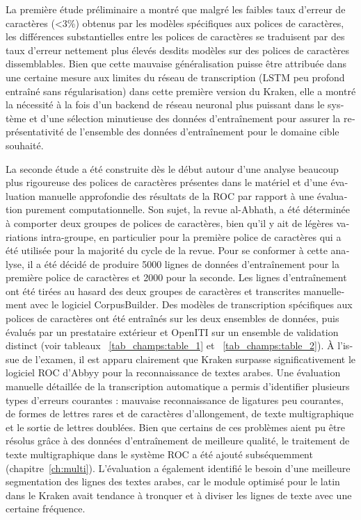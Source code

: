 \begin{french}
La première étude préliminaire a montré que malgré les faibles taux d'erreur de
caractères (<3\%) obtenus par les modèles spécifiques aux polices de
caractères, les différences substantielles entre les polices de caractères se
traduisent par des taux d'erreur nettement plus élevés desdits modèles sur des
polices de caractères dissemblables. Bien que cette mauvaise généralisation
puisse être attribuée dans une certaine mesure aux limites du réseau de
transcription (LSTM peu profond entraîné sans régularisation) dans cette
première version du Kraken, elle a montré la nécessité à la fois d'un backend
de réseau neuronal plus puissant dans le système et d'une sélection minutieuse
des données d'entraînement pour assurer la représentativité de l'ensemble des
données d'entraînement pour le domaine cible souhaité.

La seconde étude a été construite dès le début autour d'une analyse beaucoup
plus rigoureuse des polices de caractères présentes dans le matériel et d'une
évaluation manuelle approfondie des résultats de la ROC par rapport à une
évaluation purement computationnelle. Son sujet, la revue al-Abhath, a été
déterminée à comporter deux groupes de polices de caractères, bien qu'il y ait
de légères variations intra-groupe, en particulier pour la première police de
caractères qui a été utilisée pour la majorité du cycle de la revue. Pour se
conformer à cette analyse, il a été décidé de produire 5000 lignes de données
d'entraînement pour la première police de caractères et 2000 pour la seconde.
Les lignes d'entraînement ont été tirées au hasard des deux groupes de
caractères et transcrites manuellement avec le logiciel CorpusBuilder. Des
modèles de transcription spécifiques aux polices de caractères ont été
entraînés sur les deux ensembles de données, puis évalués par un prestataire
extérieur et OpenITI sur un ensemble de validation distinct (voir tableaux
~\ref{tab_champs:table_1} et ~\ref{tab_champs:table_2}). À l'issue de l'examen,
il est apparu clairement que Kraken surpasse significativement le logiciel ROC
d'Abbyy pour la reconnaissance de textes arabes. Une évaluation manuelle
détaillée de la transcription automatique a permis d'identifier plusieurs types
d'erreurs courantes : mauvaise reconnaissance de ligatures peu courantes, de
formes de lettres rares et de caractères d'allongement, de texte multigraphique
et le sortie de lettres doublées. Bien que certains de ces problèmes aient pu
être résolus grâce à des données d'entraînement de meilleure qualité, le
traitement de texte multigraphique dans le système ROC a été ajouté
subséquemment (chapitre~\ref{ch:multi}). L'évaluation a également identifié le
besoin d'une meilleure segmentation des lignes des textes arabes, car le module
optimisé pour le latin dans le Kraken avait tendance à tronquer et à diviser
les lignes de texte avec une certaine fréquence.


\end{french}
